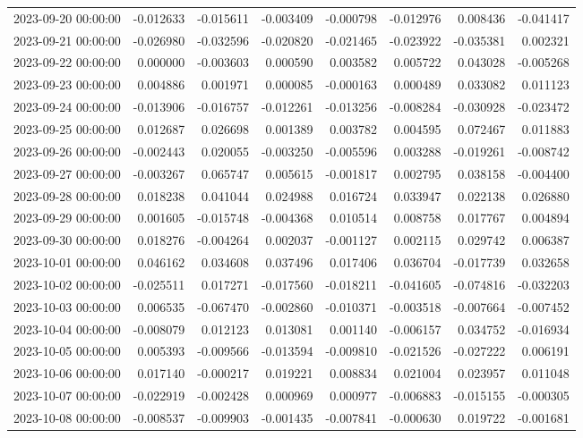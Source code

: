 \begin{tabular}{lrrrrrrr}
2023-09-20 00:00:00 & -0.012633 & -0.015611 & -0.003409 & -0.000798 & -0.012976 & 0.008436 & -0.041417 \\
2023-09-21 00:00:00 & -0.026980 & -0.032596 & -0.020820 & -0.021465 & -0.023922 & -0.035381 & 0.002321 \\
2023-09-22 00:00:00 & 0.000000 & -0.003603 & 0.000590 & 0.003582 & 0.005722 & 0.043028 & -0.005268 \\
2023-09-23 00:00:00 & 0.004886 & 0.001971 & 0.000085 & -0.000163 & 0.000489 & 0.033082 & 0.011123 \\
2023-09-24 00:00:00 & -0.013906 & -0.016757 & -0.012261 & -0.013256 & -0.008284 & -0.030928 & -0.023472 \\
2023-09-25 00:00:00 & 0.012687 & 0.026698 & 0.001389 & 0.003782 & 0.004595 & 0.072467 & 0.011883 \\
2023-09-26 00:00:00 & -0.002443 & 0.020055 & -0.003250 & -0.005596 & 0.003288 & -0.019261 & -0.008742 \\
2023-09-27 00:00:00 & -0.003267 & 0.065747 & 0.005615 & -0.001817 & 0.002795 & 0.038158 & -0.004400 \\
2023-09-28 00:00:00 & 0.018238 & 0.041044 & 0.024988 & 0.016724 & 0.033947 & 0.022138 & 0.026880 \\
2023-09-29 00:00:00 & 0.001605 & -0.015748 & -0.004368 & 0.010514 & 0.008758 & 0.017767 & 0.004894 \\
2023-09-30 00:00:00 & 0.018276 & -0.004264 & 0.002037 & -0.001127 & 0.002115 & 0.029742 & 0.006387 \\
2023-10-01 00:00:00 & 0.046162 & 0.034608 & 0.037496 & 0.017406 & 0.036704 & -0.017739 & 0.032658 \\
2023-10-02 00:00:00 & -0.025511 & 0.017271 & -0.017560 & -0.018211 & -0.041605 & -0.074816 & -0.032203 \\
2023-10-03 00:00:00 & 0.006535 & -0.067470 & -0.002860 & -0.010371 & -0.003518 & -0.007664 & -0.007452 \\
2023-10-04 00:00:00 & -0.008079 & 0.012123 & 0.013081 & 0.001140 & -0.006157 & 0.034752 & -0.016934 \\
2023-10-05 00:00:00 & 0.005393 & -0.009566 & -0.013594 & -0.009810 & -0.021526 & -0.027222 & 0.006191 \\
2023-10-06 00:00:00 & 0.017140 & -0.000217 & 0.019221 & 0.008834 & 0.021004 & 0.023957 & 0.011048 \\
2023-10-07 00:00:00 & -0.022919 & -0.002428 & 0.000969 & 0.000977 & -0.006883 & -0.015155 & -0.000305 \\
2023-10-08 00:00:00 & -0.008537 & -0.009903 & -0.001435 & -0.007841 & -0.000630 & 0.019722 & -0.001681 \\

\end{tabular}
